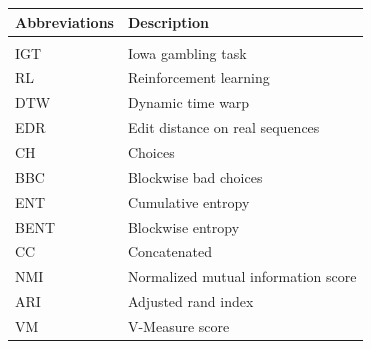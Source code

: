 \documentclass[12pt,a4paper,bibliography=totocnumbered,listof=totocnumbered]{scrartcl}
\begin{document}
\begin{tabular}{p{6cm}p{9cm}}
\textbf{Abbreviations} & \textbf{Description} 										\\
\midrule
\vspace{0.3cm} & \vspace{0.3cm} 														\\ 
IGT & Iowa gambling task \\
RL & Reinforcement learning \\
DTW & Dynamic time warp \\
EDR & Edit distance on real sequences \\
CH & Choices \\
BBC & Blockwise bad choices \\
ENT & Cumulative entropy \\
BENT & Blockwise entropy \\
CC & Concatenated \\
NMI & Normalized mutual information score \\
ARI & Adjusted rand index \\
VM & V-Measure score 
\end{tabular}

\newpage





\renewcommand{\sectionmark}[1]{\markright{#1}}
\renewcommand{\subsectionmark}[1]{}
\renewcommand{\subsubsectionmark}[1]{}
\rhead{\rightmark}
\end{document}
